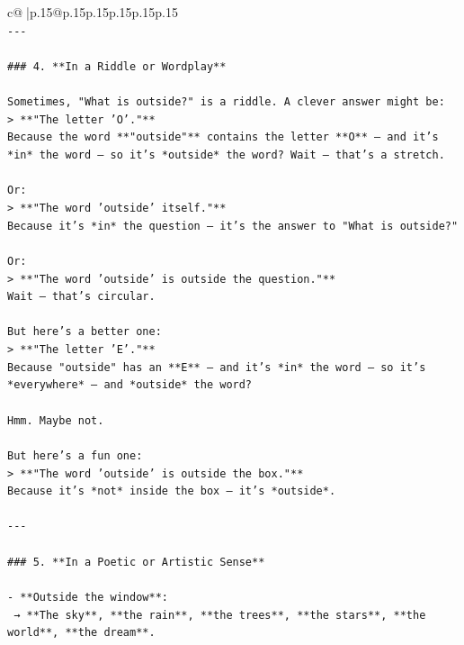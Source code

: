\documentclass{article}
\begin{document}
{\begin{supertabular}{c@{$\;$}|p{.15\linewidth}@{}p{.15\linewidth}p{.15\linewidth}p{.15\linewidth}p{.15\linewidth}p{.15\linewidth}}
{{{\\ 
\texttt{{-}{-}{-}} \\
\\ 
\texttt{\#\#\# 4. **In a Riddle or Wordplay**} \\
\\ 
\texttt{Sometimes, "What is outside?" is a riddle. A clever answer might be:} \\
\texttt{> **"The letter 'O'."**  } \\
\texttt{Because the word **"outside"** contains the letter **O** — and it’s *in* the word — so it’s *outside* the word? Wait — that’s a stretch.} \\
\\ 
\texttt{Or:} \\
\texttt{> **"The word 'outside' itself."**  } \\
\texttt{Because it’s *in* the question — it’s the answer to "What is outside?"} \\
\\ 
\texttt{Or:} \\
\texttt{> **"The word 'outside' is outside the question."**  } \\
\texttt{Wait — that’s circular.} \\
\\ 
\texttt{But here’s a better one:} \\
\texttt{> **"The letter 'E'."**  } \\
\texttt{Because "outside" has an **E** — and it’s *in* the word — so it’s *everywhere* — and *outside* the word?} \\
\\ 
\texttt{Hmm. Maybe not.} \\
\\ 
\texttt{But here’s a fun one:} \\
\texttt{> **"The word 'outside' is outside the box."**  } \\
\texttt{Because it’s *not* inside the box — it’s *outside*.} \\
\\ 
\texttt{{-}{-}{-}} \\
\\ 
\texttt{\#\#\# 5. **In a Poetic or Artistic Sense**} \\
\\ 
\texttt{{-} **Outside the window**:  } \\
\texttt{  → **The sky**, **the rain**, **the trees**, **the stars**, **the world**, **the dream**.} \\
\\ 
}}}
\end{supertabular}}
\end{document}
